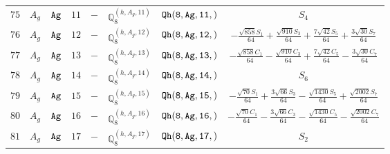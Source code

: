 \documentclass[fleqn,8pt]{jsarticle}
\begin{document}
\begin{table}[ht!]
\begin{center}
\begin{tabular}{cccccccc}
$ 75 $ & $ A_{g} $ & $ {\tt Ag} $ & $ 11 $ & $ - $ & $ \mathbb{Q}_{8}^{(h,A_{g},11)} $ & $ {\tt Qh(8,Ag,11,)} $ & $ S_{4} $ \\
$ 76 $ & $ A_{g} $ & $ {\tt Ag} $ & $ 12 $ & $ - $ & $ \mathbb{Q}_{8}^{(h,A_{g},12)} $ & $ {\tt Qh(8,Ag,12,)} $ & $ - \frac{\sqrt{858} S_{1}}{64} + \frac{\sqrt{910} S_{3}}{64} + \frac{7 \sqrt{42} S_{5}}{64} + \frac{3 \sqrt{30} S_{7}}{64} $ \\
$ 77 $ & $ A_{g} $ & $ {\tt Ag} $ & $ 13 $ & $ - $ & $ \mathbb{Q}_{8}^{(h,A_{g},13)} $ & $ {\tt Qh(8,Ag,13,)} $ & $ - \frac{\sqrt{858} C_{1}}{64} - \frac{\sqrt{910} C_{3}}{64} + \frac{7 \sqrt{42} C_{5}}{64} - \frac{3 \sqrt{30} C_{7}}{64} $ \\
$ 78 $ & $ A_{g} $ & $ {\tt Ag} $ & $ 14 $ & $ - $ & $ \mathbb{Q}_{8}^{(h,A_{g},14)} $ & $ {\tt Qh(8,Ag,14,)} $ & $ S_{6} $ \\
$ 79 $ & $ A_{g} $ & $ {\tt Ag} $ & $ 15 $ & $ - $ & $ \mathbb{Q}_{8}^{(h,A_{g},15)} $ & $ {\tt Qh(8,Ag,15,)} $ & $ - \frac{\sqrt{70} S_{1}}{64} + \frac{3 \sqrt{66} S_{3}}{64} - \frac{\sqrt{1430} S_{5}}{64} + \frac{\sqrt{2002} S_{7}}{64} $ \\
$ 80 $ & $ A_{g} $ & $ {\tt Ag} $ & $ 16 $ & $ - $ & $ \mathbb{Q}_{8}^{(h,A_{g},16)} $ & $ {\tt Qh(8,Ag,16,)} $ & $ - \frac{\sqrt{70} C_{1}}{64} - \frac{3 \sqrt{66} C_{3}}{64} - \frac{\sqrt{1430} C_{5}}{64} - \frac{\sqrt{2002} C_{7}}{64} $ \\
$ 81 $ & $ A_{g} $ & $ {\tt Ag} $ & $ 17 $ & $ - $ & $ \mathbb{Q}_{8}^{(h,A_{g},17)} $ & $ {\tt Qh(8,Ag,17,)} $ & $ S_{2} $ \\
 \hline \hline
\end{tabular}
\end{center}
\end{table}
\end{document}
